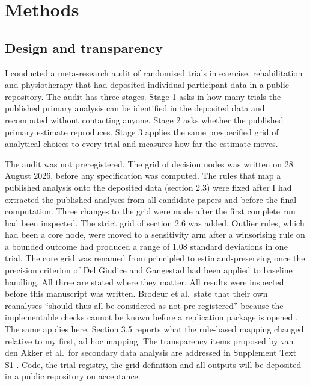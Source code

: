 \section{Methods}\label{methods}

\subsection{Design and transparency}\label{design-and-transparency}

I conducted a meta-research audit of randomised trials in exercise, rehabilitation and physiotherapy that had deposited individual participant data in a public repository. The audit has three stages. Stage 1 asks in how many trials the published primary analysis can be identified in the deposited data and recomputed without contacting anyone. Stage 2 asks whether the published primary estimate reproduces. Stage 3 applies the same prespecified grid of analytical choices to every trial and measures how far the estimate moves.

The audit was not preregistered. The grid of decision nodes was written on 28 August 2026, before any specification was computed. The rules that map a published analysis onto the deposited data (section 2.3) were fixed after I had extracted the published analyses from all candidate papers and before the final computation. Three changes to the grid were made after the first complete run had been inspected. The strict grid of section 2.6 was added. Outlier rules, which had been a core node, were moved to a sensitivity arm after a winsorising rule on a bounded outcome had produced a range of 1.08 standard deviations in one trial. The core grid was renamed from principled to estimand-preserving once the precision criterion of Del Giudice and Gangestad had been applied to baseline handling. All three are stated where they matter. All results were inspected before this manuscript was written. Brodeur et al.~state that their own reanalyses ``should thus all be considered as not pre-registered'' because the implementable checks cannot be known before a replication package is opened \cite{Brodeur_2026}. The same applies here. Section 3.5 reports what the rule-based mapping changed relative to my first, ad hoc mapping. The transparency items proposed by van den Akker et al.~for secondary data analysis are addressed in Supplement Text S1 \cite{Van_den_Akker_2021}. Code, the trial registry, the grid definition and all outputs will be deposited in a public repository on acceptance.

